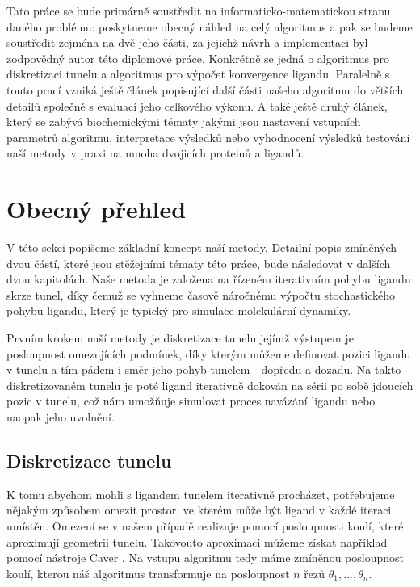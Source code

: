 Tato práce se bude primárně soustředit na informaticko-matematickou stranu
daného problému: poskytneme obecný náhled na celý algoritmus a pak se budeme
soustředit zejména na dvě jeho části, za jejichž návrh a implementaci byl
zodpovědný autor této diplomové práce. Konkrétně se jedná o algoritmus pro
diskretizaci tunelu a algoritmus pro výpočet konvergence ligandu. Paralelně
s touto prací vzniká ještě článek popisující další části našeho algoritmu
do větších detailů společně s evaluací jeho celkového výkonu. A také ještě
druhý článek, který se zabývá biochemickými tématy jakými jsou nastavení
vstupních parametrů algoritmu, interpretace výsledků nebo vyhodnocení výsledků
testování naší metody v praxi na mnoha dvojicích proteinů a ligandů.

\section{Obecný přehled}
V této sekci popíšeme základní koncept naší metody. Detailní popis zmíněných
dvou částí, které jsou stěžejními tématy této práce, bude následovat v dalších
dvou kapitolách. Naše metoda je založena na řízeném iterativním pohybu ligandu
skrze tunel, díky čemuž se vyhneme časově náročnému výpočtu stochastického
pohybu ligandu, který je typický pro simulace molekulární dynamiky.

Prvním krokem naší metody je diskretizace tunelu jejímž výstupem je posloupnost
omezujících podmínek, díky kterým můžeme definovat pozici ligandu v tunelu a
tím pádem i směr jeho pohyb tunelem - dopředu a dozadu. Na takto diskretizovaném
tunelu je poté ligand iterativně dokován na sérii po sobě jdoucích pozic v tunelu,
což nám umožňuje simulovat proces navázání ligandu nebo naopak jeho uvolnění.

\subsection{Diskretizace tunelu}
K tomu abychom mohli s ligandem tunelem iterativně procházet, potřebujeme nějakým
způsobem omezit prostor, ve kterém může být ligand v každé iteraci umístěn.
Omezení se v našem případě realizuje pomocí posloupnosti koulí, které aproximují
geometrii tunelu. Takovouto aproximaci můžeme získat například pomocí nástroje
Caver . Na vstupu algoritmu tedy máme zmíněnou posloupnost
koulí, kterou náš algoritmus transformuje na posloupnost $ n $ řezů
$ \theta_1, \dots, \theta_n $.
